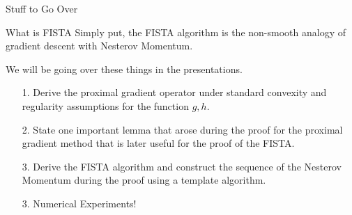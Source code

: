\documentclass[11pt]{beamer}
\begin{document}
        \begin{frame}{Stuff to Go Over}
            \begin{block}{What is FISTA}
                Simply put, the FISTA algorithm is the non-smooth analogy of gradient descent with Nesterov Momentum.     
            \end{block}
            We will be going over these things in the presentations. 
            \begin{itemize}
                \item [1.] Derive the proximal gradient operator under standard convexity and regularity assumptions for the function $g, h$. 
                \pause\item [2.] State one important lemma that arose during the proof for the proximal gradient method that is later useful for the proof of the FISTA. 
                \pause\item [3.] Derive the FISTA algorithm and construct the sequence of the Nesterov Momentum during the proof using a template algorithm. 
                \pause\item [3.] Numerical Experiments!
            \end{itemize}
        \end{frame}
\end{document}
